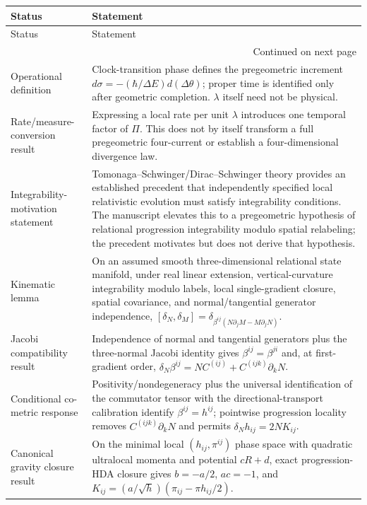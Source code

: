 \documentclass[11pt]{article}
\begin{document}
\begin{longtable}{@{}p{}p{}@{}}
\toprule
Status & Statement \\
\midrule
\endfirsthead
\toprule
Status & Statement \\
\midrule
\endhead
\midrule
\multicolumn{2}{r}{\small Continued on next page}\\
\endfoot
\bottomrule
\endlastfoot
Operational definition & Clock-transition phase defines the pregeometric increment $d\sigma=-(\hbar/\Delta E)d(\Delta\theta)$; proper time is identified only after geometric completion. $\lambda$ itself need not be physical. \\
Rate/measure-conversion result & Expressing a local rate per unit $\lambda$ introduces one temporal factor of $\Pi$. This does not by itself transform a full pregeometric four-current or establish a four-dimensional divergence law. \\
Integrability-motivation statement & Tomonaga--Schwinger/Dirac--Schwinger theory provides an established precedent that independently specified local relativistic evolution must satisfy integrability conditions. The manuscript elevates this to a pregeometric hypothesis of relational progression integrability modulo spatial relabeling; the precedent motivates but does not derive that hypothesis. \\
Kinematic lemma & On an assumed smooth three-dimensional relational state manifold, under real linear extension, vertical-curvature integrability modulo labels, local single-gradient closure, spatial covariance, and normal/tangential generator independence, $[\delta_N,\delta_M]=\delta_{\beta^{ij}(N\partial_jM-M\partial_jN)}$. \\
Jacobi compatibility result & Independence of normal and tangential generators plus the three-normal Jacobi identity gives $\beta^{ij}=\beta^{ji}$ and, at first-gradient order, $\delta_N\beta^{ij}=NC^{(ij)}+C^{(ijk)}\partial_kN$. \\
Conditional co-metric response & Positivity/nondegeneracy plus the universal identification of the commutator tensor with the directional-transport calibration identify $\beta^{ij}=h^{ij}$; pointwise progression locality removes $C^{(ijk)}\partial_kN$ and permits $\delta_Nh_{ij}=2NK_{ij}$. \\
Canonical gravity closure result & On the minimal local $(h_{ij},\pi^{ij})$ phase space with quadratic ultralocal momenta and potential $cR+d$, exact progression-HDA closure gives $b=-a/2$, $ac=-1$, and $K_{ij}=(a/\sqrt h)(\pi_{ij}-\pi h_{ij}/2)$. \\

\end{longtable}
\end{document}
